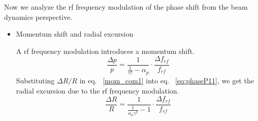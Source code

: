 Now we analyze the rf frequency modulation of the phase shift from the beam dynamics perspective.
\begin{itemize}

	\item Momentum shift and radial excursion

A rf frequency modulation introduces a momentum shift. 
\begin{equation}
\frac{\Delta{p}}{p}  = \frac{1}{\frac{1}{\gamma^2}-\alpha_{\mathit{p}}}\cdot \frac{\Delta f_{\mathit{rf}}}{f_{\mathit{rf}}}
\label{eq:phaseP11}
\end{equation}
Substituting ${\Delta R}/{R}$ in eq. ~\ref{mom_com1} into eq. ~\ref{eq:phaseP11}, we get the radial excursion due to the rf frequency modulation.
\begin{equation}
\label{eq:phaseR}
\frac{\Delta{R}}{R} =\frac{1}{{\frac{1}{\alpha_{\mathit{p}}\gamma^2}-1}}\cdot\frac{\Delta f_{\mathit{rf}}}{f_{\mathit{rf}}}
\end{equation}


\end{itemize}
